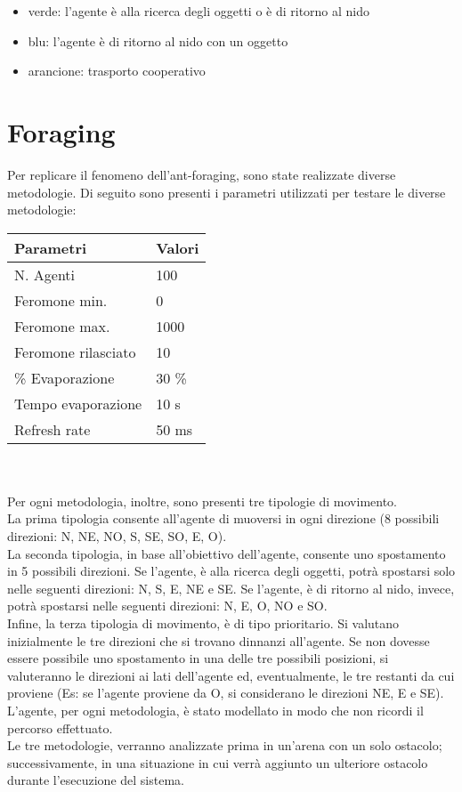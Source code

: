 \documentclass[12pt,a4paper,openright,twoside]{report}
\begin{document}
\begin{itemize}
	\item verde: l'agente è alla ricerca degli oggetti o è di ritorno al nido
	\item blu: l'agente è di ritorno al nido con un oggetto
	\item arancione: trasporto cooperativo
\end{itemize}

\section{Foraging}

Per replicare il fenomeno dell'ant-foraging, sono state realizzate diverse metodologie.
Di seguito sono presenti i parametri utilizzati per testare le diverse metodologie:\\

\begin{tabular}{p{5cm}|p{5cm}} 
	 \textbf{ Parametri} & \textbf{ Valori} \\ \hline
	 N. Agenti & 100 \\
	 Feromone min. & 0 \\
	 Feromone max. & 1000 \\
	 Feromone rilasciato & 10\\
	 \% Evaporazione & 30 \% \\
	 Tempo evaporazione & 10 s \\
	 Refresh rate & 50 ms 
\end{tabular}
\\\\
Per ogni metodologia, inoltre, sono presenti tre tipologie di movimento.\\ La prima tipologia consente all'agente di muoversi in ogni direzione (8 possibili direzioni: N, NE, NO, S, SE, SO, E, O).\\
La seconda tipologia, in base all'obiettivo dell'agente, consente uno spostamento in 5 possibili direzioni. Se l'agente, è alla ricerca degli oggetti, potrà spostarsi solo nelle seguenti direzioni: N, S, E, NE e SE.  Se l'agente, è di ritorno al nido, invece, potrà spostarsi nelle seguenti direzioni: N, E, O, NO e SO.\\
Infine, la terza tipologia di movimento, è di tipo prioritario. Si valutano inizialmente le tre direzioni che si trovano dinnanzi all'agente. Se non dovesse essere possibile uno spostamento in una delle tre possibili posizioni, si valuteranno le direzioni ai lati dell'agente ed, eventualmente, le tre restanti da cui proviene (Es: se l'agente proviene da O, si considerano le direzioni NE, E e SE).\\
L'agente, per ogni metodologia, è stato modellato in modo che non ricordi il percorso effettuato.\\
Le tre metodologie, verranno analizzate prima in un'arena con un solo ostacolo; successivamente, in una situazione in cui verrà aggiunto un ulteriore ostacolo durante l'esecuzione del sistema.\\
\end{document}
